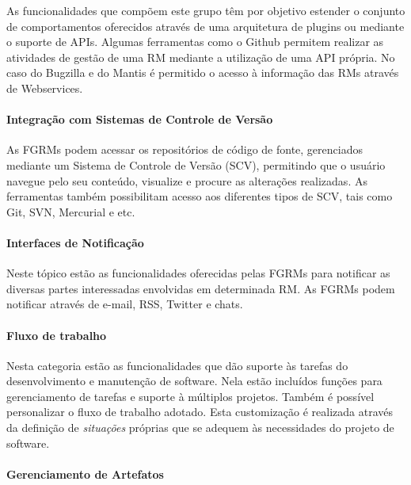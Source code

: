 As funcionalidades que compõem este grupo têm por objetivo estender o conjunto
de comportamentos oferecidos através de uma arquitetura de plugins ou mediante o
suporte de APIs. Algumas ferramentas como o Github permitem realizar as
atividades de gestão de uma RM mediante a utilização de uma API própria. No caso
do Bugzilla e do Mantis é permitido o acesso à informação das RMs através de
Webservices.

\paragraph{Integração com Sistemas de Controle de Versão}
\label{par:integração_com_sistemas_de_controle_de_versão}

As FGRMs podem acessar os repositórios de código de fonte, gerenciados mediante
um Sistema de Controle de Versão (SCV), permitindo que o usuário navegue pelo
seu conteúdo, visualize e procure as alterações realizadas. As ferramentas
também possibilitam acesso aos diferentes tipos de SCV, tais como Git, SVN,
Mercurial e etc.

\paragraph{Interfaces de Notificação}
\label{par:interfaces_de_notificação}

Neste tópico estão as funcionalidades oferecidas pelas FGRMs para notificar as
diversas partes interessadas envolvidas em determinada RM\@. As FGRMs podem
notificar através de e-mail, RSS, Twitter e chats.

\paragraph{Fluxo de trabalho}
\label{par:fluxo_de_trabalho}

Nesta categoria estão as funcionalidades que dão suporte às tarefas do
desenvolvimento e manutenção de software. Nela estão incluídos funções para
gerenciamento de tarefas e suporte à múltiplos projetos. Também é possível
personalizar o fluxo de trabalho adotado. Esta customização é realizada através
da definição de \textit{situações} próprias que se adequem às necessidades do
projeto de software.

\paragraph{Gerenciamento de Artefatos}
\label{par:gerenciamento_de_artefatos}

